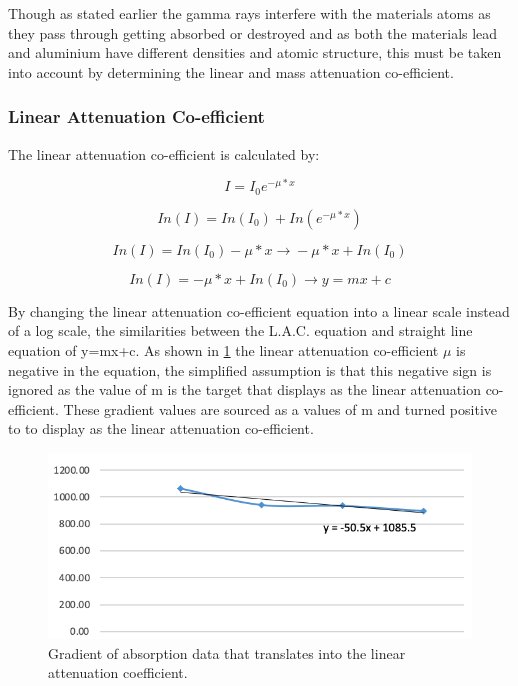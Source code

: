 \documentclass[12pt]{article}
\begin{document}
Though as stated earlier the gamma rays interfere with the materials atoms as they pass through getting absorbed or destroyed and as both the materials lead and aluminium have different densities and atomic structure, this must be taken into account by determining the linear and mass attenuation co-efficient.

\subsubsection{Linear Attenuation Co-efficient}
\label{LAC SubsubSection}

The linear attenuation co-efficient is calculated by\cite{Exp.C-2020}:

\begin{equation}
I = I_0 e^{-\mu*x} 
\label{I1 Eq}
\end{equation}

\begin{equation}
In(I) = In(I_0) + In(e^{-\mu*x})
\label{I2 Eq}
\end{equation} 

\begin{equation}
In(I) = In(I_0) -\mu*x \xrightarrow{} -\mu*x + In(I_0)
\label{I3 Eq}
\end{equation} 

\begin{equation}
In(I) = -\mu*x + In(I_0) \xrightarrow{} y=mx+c
\label{I4 Eq}
\end{equation} 

By changing the linear attenuation co-efficient equation into a linear scale instead of a log scale, the similarities between the L.A.C. equation and straight line equation of y=mx+c. As shown in \cref{LACgraph} the linear attenuation co-efficient $\mu$ is negative in the equation, the simplified assumption is that this negative sign is ignored as the value of m is the target that displays as the linear attenuation co-efficient. These gradient values are sourced as a values of m and turned positive to to display as the linear attenuation co-efficient. \\

\begin{figure}[H]
\centering
\includegraphics[scale=0.6]{Images/LAC.png}
\caption{Gradient of absorption data that translates into the linear attenuation coefficient.}
\label{LACgraph}
\end{figure}
\end{document}

